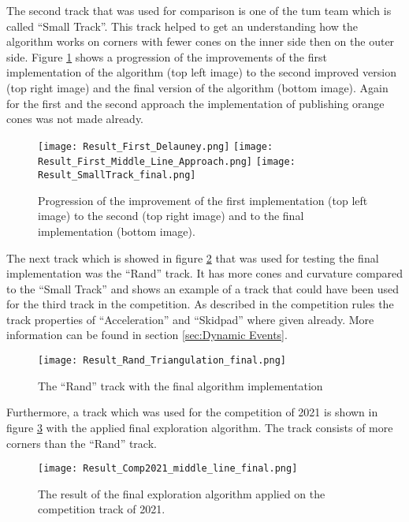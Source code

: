 The second track that was used for comparison is one of the \acrlong{tum} team which is called ``Small Track''. \cite{tumftm_optimization_algoritm} This track helped to get an understanding how the algorithm works on corners with fewer cones on the inner side then on the outer side. Figure \ref{fig:Result small track} shows a progression of the improvements of the first implementation of the algorithm (top left image) to the second improved version (top right image) and the final version of the algorithm (bottom image). Again for the first and the second approach the implementation of publishing orange cones was not made already.

\begin{figure}[H]
    \centering
    \texttt{[image: Result\_First\_Delauney.png]}\hfill
    \texttt{[image: Result\_First\_Middle\_Line\_Approach.png]}
    \texttt{[image: Result\_SmallTrack\_final.png]}
    \caption{Progression of the improvement of the first implementation (top left image) to the second (top right image) and to the final implementation (bottom image).}
    \label{fig:Result small track}
\end{figure}

The next track which is showed in figure \ref{fig:Result final middle line rand track} that was used for testing the final implementation was the ``Rand'' track. It has more cones and curvature compared to the ``Small Track'' and shows an example of a track that could have been used for the third track in the competition. As described in the competition rules the track properties of ``Acceleration'' and ``Skidpad'' where given already. More information can be found in section \ref{sec:Dynamic Events}.
\begin{figure}[H]
    \centering
    \texttt{[image: Result\_Rand\_Triangulation\_final.png]}
    \caption{The ``Rand'' track with the final algorithm implementation}
    \label{fig:Result final middle line rand track}
\end{figure}

Furthermore, a track which was used for the competition of 2021 is shown in figure \ref{fig:Result final middle line 2021 competition track} with the applied final exploration algorithm. The track consists of more corners than the ``Rand'' track.
\begin{figure}[H]
    \centering
    \texttt{[image: Result\_Comp2021\_middle\_line\_final.png]}
    \caption{The result of the final exploration algorithm applied on the competition track of 2021.}
    \label{fig:Result final middle line 2021 competition track}
\end{figure}

